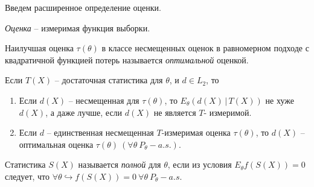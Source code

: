     Введем расширенное определение оценки.
    \begin{definition}
        \textit{Оценка} -- измеримая функция выборки.
    \end{definition}
    \begin{definition}
        Наилучшая оценка $\tau(\theta)$ в классе несмещенных оценок в равномерном подходе с квадратичной функцией потерь называется \textit{оптимальной} оценкой.
    \end{definition}
    \begin{corollary}
        Если $T(X)$ -- достаточная статистика для $\theta$, и $d\in L_2$, то
        \begin{enumerate}
            \item Если $d(X)$ -- несмещенная для $\tau(\theta)$, то $E_\theta(d(X)\, \vert\, T(X))$ не хуже $d(X)$, а даже лучше, если $d(X)$ не является $T$- измеримой.
            \item Если $d$ -- единственная несмещенная $T$-измеримая оценка $\tau(\theta)$, то $d(X)$ -- оптимальная оценка $\tau(\theta)\ (\forall \theta\ P_\theta-a.s.)$.
        \end{enumerate}
    \end{corollary}
    
    \begin{definition}
        Статистика $S(X)$ называется \textit{полной} для $\theta$, если из условия $E_\theta f(S(X)) = 0$ следует, что $\forall \theta \hookrightarrow f(S(X)) = 0\ \forall \theta\ P_\theta-a.s.$
    \end{definition}